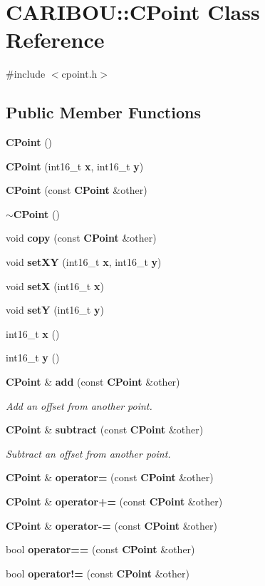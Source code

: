 \section{C\-A\-R\-I\-B\-O\-U\-:\-:C\-Point Class Reference}
\label{class_c_a_r_i_b_o_u_1_1_c_point}


{\ttfamily \#include $<$cpoint.\-h$>$}

\subsection*{Public Member Functions}
\begin{DoxyCompactItemize}
\item 
{\bf C\-Point} ()
\item 
{\bf C\-Point} (int16\-\_\-t {\bf x}, int16\-\_\-t {\bf y})
\item 
{\bf C\-Point} (const {\bf C\-Point} \&other)
\item 
{\bf $\sim$\-C\-Point} ()
\item 
void {\bf copy} (const {\bf C\-Point} \&other)
\item 
void {\bf set\-X\-Y} (int16\-\_\-t {\bf x}, int16\-\_\-t {\bf y})
\item 
void {\bf set\-X} (int16\-\_\-t {\bf x})
\item 
void {\bf set\-Y} (int16\-\_\-t {\bf y})
\item 
int16\-\_\-t {\bf x} ()
\item 
int16\-\_\-t {\bf y} ()
\item 
{\bf C\-Point} \& {\bf add} (const {\bf C\-Point} \&other)
\begin{DoxyCompactList}\small\item\em Add an offset from another point. \end{DoxyCompactList}\item 
{\bf C\-Point} \& {\bf subtract} (const {\bf C\-Point} \&other)
\begin{DoxyCompactList}\small\item\em Subtract an offset from another point. \end{DoxyCompactList}\item 
{\bf C\-Point} \& {\bf operator=} (const {\bf C\-Point} \&other)
\item 
{\bf C\-Point} \& {\bf operator+=} (const {\bf C\-Point} \&other)
\item 
{\bf C\-Point} \& {\bf operator-\/=} (const {\bf C\-Point} \&other)
\item 
bool {\bf operator==} (const {\bf C\-Point} \&other)
\item 
bool {\bf operator!=} (const {\bf C\-Point} \&other)
\end{DoxyCompactItemize}


